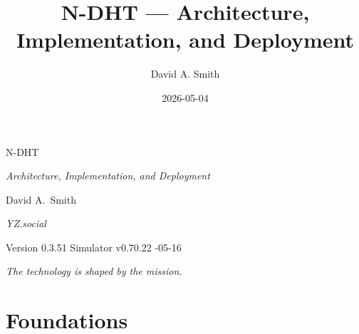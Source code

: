 \documentclass[twoside,nobib]{tufte-book}
\title{N-DHT --- Architecture, Implementation, and Deployment}
\author{David A. Smith}
\date{2026-05-04}
\newcommand{\NDHT}{N-DHT\xspace}
\begin{document}

\frontmatter

\thispagestyle{empty}
\begin{fullwidth}
\null\vfill
{\fontsize{48}{52}\selectfont \textsc{N-DHT}\par}
\vspace{0.6em}
{\Large\itshape Architecture, Implementation, and Deployment\par}
\vspace{4em}
{\large David A.~Smith\par}
{\itshape\small YZ.social\par}
\vspace{2em}
{\small Version 0.3.51 \quad Simulator v0.70.22 -05-16\par}
\vfill
\end{fullwidth}
\newpage

\thispagestyle{empty}
\null\vfill
\begin{fullwidth}
\begin{flushright}
\itshape The technology is shaped by the mission.\par
\end{flushright}
\end{fullwidth}
\vfill
\null\newpage

\tableofcontents

\mainmatter

\pagestyle{plain}


\part{Foundations}
\end{document}

